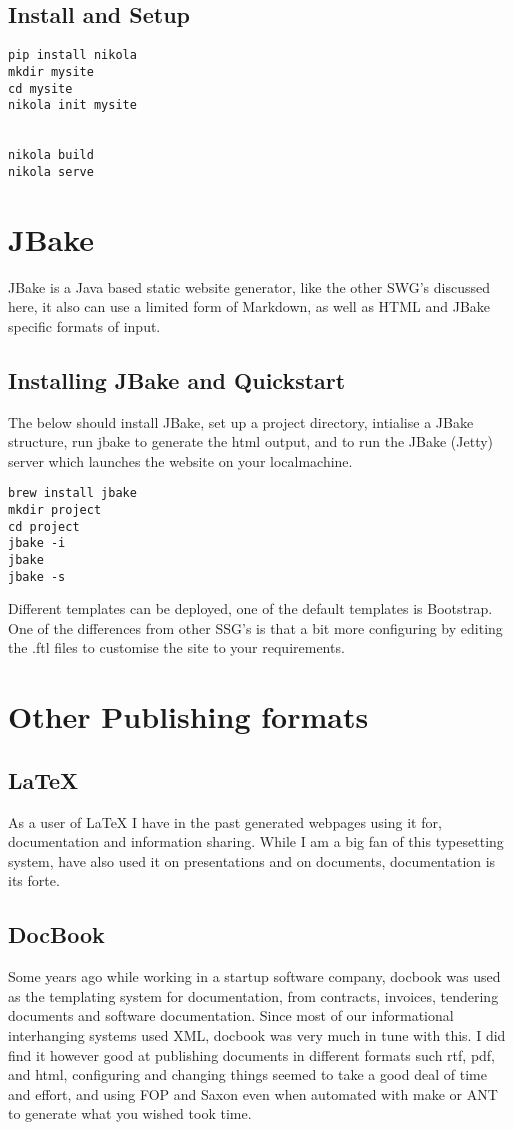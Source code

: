 \documentclass[12pt]{article}			%
\begin{document}
\subsection{Install and Setup}
\begin{verbatim}
pip install nikola
mkdir mysite
cd mysite
nikola init mysite


nikola build
nikola serve 
\end{verbatim}

\newpage
\section{JBake}
JBake is a Java based static website generator, like the other SWG's discussed here, it also can use a limited form of Markdown, as well as HTML and JBake specific formats of input.
\subsection{Installing JBake and Quickstart}
The below should install JBake, set up a project directory, intialise a JBake structure, run jbake to generate the html output, and to run the JBake (Jetty) server which launches the website on your localmachine.
\begin{verbatim}
brew install jbake
mkdir project
cd project
jbake -i
jbake
jbake -s
\end{verbatim}
Different templates can be deployed, one of the default templates is Bootstrap. One of the differences from other SSG's is that a bit more configuring by editing the .ftl files to customise the site to your requirements.


\newpage
\section{Other Publishing formats}
\subsection{LaTeX}
As a user of LaTeX I have in the past generated webpages using it for, documentation and information sharing. While I am a big fan of this typesetting system, have also used it on presentations and on documents, documentation is its forte.
\subsection{DocBook}
Some years ago while working in a startup software company, docbook was used as the templating system for documentation, from contracts, invoices, tendering documents and software documentation. Since most of our informational interhanging systems used XML, docbook was very much in tune with this. I did find it however good at publishing documents in different formats such rtf, pdf, and html, configuring and changing things seemed to take a good deal of time and effort, and using FOP and Saxon even when automated with make or ANT to generate what you wished took time.  
\end{document}
